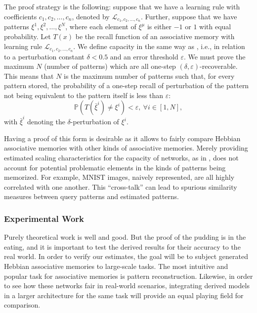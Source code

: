 \documentclass{article}
\theoremstyle{definition}
\begin{document}
The proof strategy is the following: suppose
that we have a learning rule with coefficients $c_1, c_2, \dots, c_n$,
denoted by $\mathcal{L}_{c_1, c_2, \dots, c_n}$. Further, suppose
that we have patterns $\xi^1, \xi^2, \dots, \xi^N$, where
each element of $\xi^\mu$ is either $-1$ or $1$ with equal probability.
Let $T(x)$ be the recall function of an associative memory with learning
rule $\mathcal{L}_{c_1, c_2, \dots, c_n}$. We define capacity in
the same way as \textcite{bao_capacity_2022}, i.e., in relation
to a perturbation constant $\delta < 0.5$ and an error threshold $\varepsilon$.
We must prove the maximum $N$ (number of patterns) which are
all one-step $(\delta, \varepsilon)$-recoverable. This means that
$N$ is the maximum number of patterns such that, for every pattern stored,
the probability of a one-step recall of perturbation of the pattern
not being equivalent to the pattern itself is less than $\varepsilon$:
\begin{equation}
  \mathbb{P}(T(\bar \xi^i) \neq \xi^i) < \varepsilon, ~\forall i \in [1, N],
\end{equation}
with $\bar \xi^i$ denoting the $\delta$-perturbation of $\xi^i$.

Having a proof of this form is desirable as it allows to fairly compare
Hebbian associative memories with other kinds of associative memories.
Merely providing estimated scaling characteristics for
the capacity of networks, as in \textcite{lansner_benchmarking_2025}, does
not account for potential problematic elements in the kinds of patterns
being memorized. For example, MNIST \parencite{lecun_mnist_2010}
images, naively represented, are all highly correlated with one another.
This ``cross-talk'' \parencite{kohonen_correlation_1988} can lead
to spurious similarity measures between query patterns and estimated
patterns.

\subsubsection{Experimental Work}

Purely theoretical work is well and good. But the proof of the
pudding is in the eating,
and it is important to test the derived results for their accuracy to
the real world.
In order to verify our estimates, the goal will be to subject generated Hebbian
associative memories to large-scale tasks. The most intuitive and popular
task for associative memories is pattern reconstruction. Likewise, in order
to see how these networks fair in real-world scenarios, integrating
derived models in a larger architecture for the same task will provide
an equal playing field for comparison.
\end{document}

